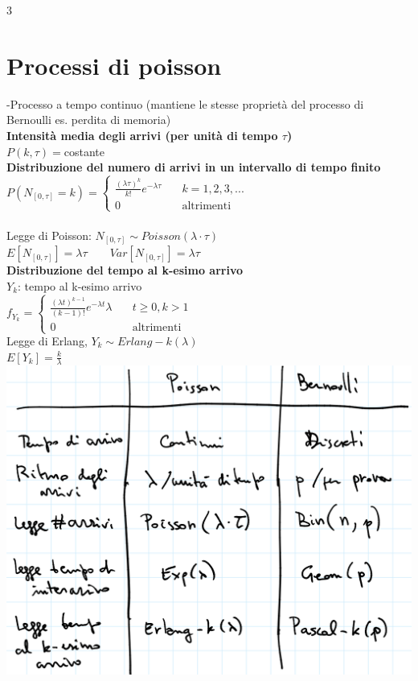 \documentclass{article}
\begin{document}
\begin{multicols*}{3}
		\section{Processi di poisson}
		-Processo a tempo continuo (mantiene le stesse proprietà del processo di Bernoulli es. perdita di memoria)\\
		\textbf{Intensità media degli arrivi (per unità di tempo \(\tau\))}\\
		\(P(k,\tau) =\)costante\\
		\textbf{Distribuzione del numero di arrivi in un intervallo di tempo finito}\\
		\(P(N_{[0,\tau]} = k )= 
		\left\{
		\begin{alignedat}{2}
			\frac{(\lambda \tau )^k}{k!}e^{-\lambda\tau}  & \quad k=1,2,3,...\\
			0            & \quad \text{altrimenti}
		\end{alignedat}
		\right.\)\\\\
		Legge di Poisson: \(N_{[0,\tau]} \sim Poisson(\lambda\cdot\tau)\)\\
		\(E[N_{[0,\tau]}] = \lambda\tau \)\(\qquad Var[N_{[0,\tau]}] = \lambda\tau\)\\
		\textbf{Distribuzione del tempo al k-esimo arrivo}\\
		\(Y_k\): tempo al k-esimo arrivo\\
		\(f_{Y_k} = 
		\left\{
		\begin{alignedat}{2}
			\frac{(\lambda t)^{k-1}}{(k-1)!}e^{-\lambda t}\lambda  & \quad t\geq 0,k>1\\
			0            & \quad \text{altrimenti}
		\end{alignedat}
		\right.\)\\
		Legge di Erlang, \(Y_k \sim Erlang-k(\lambda)\)\\
		\(E[Y_k] = \frac{k}{\lambda}\)\\
		\includegraphics[scale=0.2]{pb}\\\\

\end{multicols*}
\end{document}
